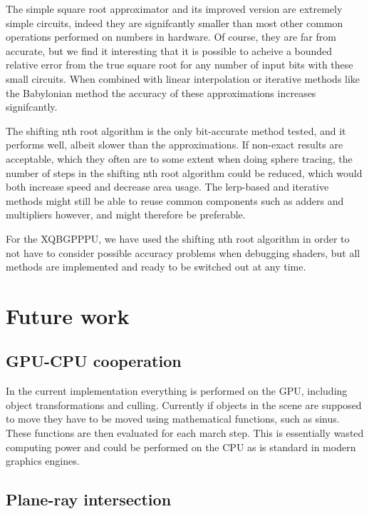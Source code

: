 		The simple square root approximator and its improved version are
		extremely simple circuits, indeed they are signifcantly smaller than
		most other common operations performed on numbers in hardware. Of
		course, they are far from accurate, but we find it interesting that it
		is possible to acheive a bounded relative error from the true square
		root for any number of input bits with these small circuits. When
		combined with linear interpolation or iterative methods like the
		Babylonian method the accuracy of these approximations increases
		signifcantly.
		
		The shifting nth root algorithm is the only bit-accurate method tested,
		and it performs well, albeit slower than the approximations. If
		non-exact results are acceptable, which they often are to some extent
		when doing sphere tracing, the number of steps in the shifting nth root
		algorithm could be reduced, which would both increase speed and
		decrease area usage. The lerp-based and iterative methods might still
		be able to reuse common components such as adders and multipliers
		however, and might therefore be preferable.
		
		For the XQBGPPPU, we have used the shifting nth root algorithm in order
		to not have to consider possible accuracy problems when debugging
		shaders, but all methods are implemented and ready to be switched out
		at any time.

	\section{Future work}

		\subsection{GPU-CPU cooperation}

			In the current implementation everything is performed on the GPU,
			including object transformations and culling. Currently if objects
			in the scene are supposed to move they have to be moved using
			mathematical functions, such as sinus. These functions are then
			evaluated for each march step. This is essentially wasted computing
			power and could be performed on the CPU as is standard in modern
			graphics engines.

		\subsection{Plane-ray intersection}

